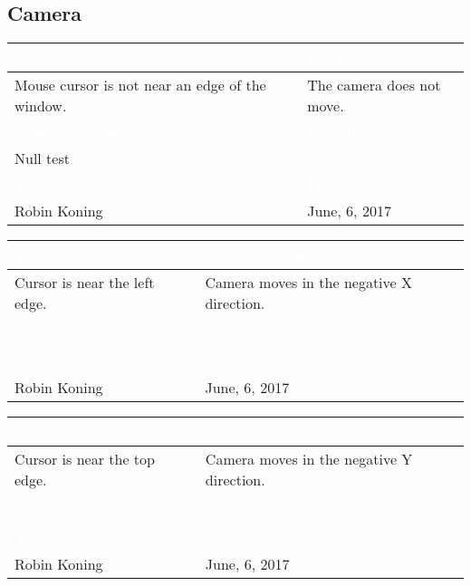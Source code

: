 \subsection{Camera}

\begin{tabularx}{\textwidth}{|X|X|}
\hline
\rowcolor{lightgray}\textcolor{white}{\textbf{Test scenario}} &
\textcolor{white}{\textbf{Desired result}}       
\\\hline
Mouse cursor is not near an edge of the window. &
The camera does not move.         
\\\hline
\rowcolor{lightgray}\textcolor{white}{\textbf{Comments/suggestions}} & 
\textcolor{white}{\textbf{Passed}}
\\\hline
Null test & \cellcolor{green}                       
\\\hline
\rowcolor{lightgray}\textcolor{white}{\textbf{Tester}} & 
\textcolor{white}{\textbf{Date}}               
\\\hline
Robin Koning & June, 6, 2017                               		 
\\\hline
\end{tabularx}

\begin{tabularx}{\textwidth}{|X|X|}
\hline
\rowcolor{lightgray}\textcolor{white}{\textbf{Test scenario}} &
\textcolor{white}{\textbf{Desired result}}       
\\\hline
Cursor is near the left edge. &
Camera moves in the negative X direction.         
\\\hline
\rowcolor{lightgray}\textcolor{white}{\textbf{Comments/suggestions}} & 
\textcolor{white}{\textbf{Passed}}
\\\hline
 & \cellcolor{green}                       
\\\hline
\rowcolor{lightgray}\textcolor{white}{\textbf{Tester}} & 
\textcolor{white}{\textbf{Date}}               
\\\hline
Robin Koning & June, 6, 2017                               		 
\\\hline
\end{tabularx}

\begin{tabularx}{\textwidth}{|X|X|}
\hline
\rowcolor{lightgray}\textcolor{white}{\textbf{Test scenario}} &
\textcolor{white}{\textbf{Desired result}}       
\\\hline
Cursor is near the top edge. &
Camera moves in the negative Y direction.         
\\\hline
\rowcolor{lightgray}\textcolor{white}{\textbf{Comments/suggestions}} & 
\textcolor{white}{\textbf{Passed}}
\\\hline
 & \cellcolor{green}                       
\\\hline
\rowcolor{lightgray}\textcolor{white}{\textbf{Tester}} & 
\textcolor{white}{\textbf{Date}}               
\\\hline
Robin Koning & June, 6, 2017                               		 
\\\hline
\end{tabularx}

